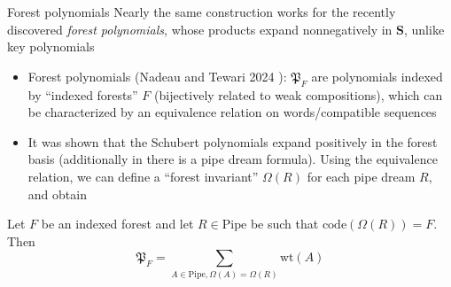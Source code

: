 \documentclass[aspectratio=169]{beamer}
\newcommand{\coma}{\mathbf{S}}
\newcommand{\dcoma}{\mathcal{DS}}
\newcommand{\Forest}[1]{\mathfrak{P}_{#1}}
\newcommand{\RC}{\mathrm{Pipe}}
\begin{document}


\begin{frame}{Forest polynomials}
    Nearly the same construction works for the recently discovered \emph{forest polynomials}, whose products expand nonnegatively in $\coma$, unlike key polynomials
\begin{itemize}
\item Forest polynomials (Nadeau and Tewari 2024 \cite{nadeau2024forest}): $\Forest{F}$ are polynomials indexed by ``indexed forests'' $F$ (bijectively related to weak compositions), which can be characterized by an equivalence relation on words/compatible sequences
\item It was shown that the Schubert polynomials expand positively in the forest basis (additionally in \cite{guo2026forest} there is a pipe dream formula). Using the equivalence relation, we can define a ``forest invariant'' $\Omega(R)$ for each pipe dream $R$, and obtain
\end{itemize}
\begin{theorem}[S, 2026+]
Let $F$ be an indexed forest and let $R\in\RC$ be such that $\mathrm{code}(\Omega(R))=F$. Then
$$\Forest{F}= \sum_{A\in\RC, \Omega(A) = \Omega(R)} \mathrm{wt}(A)$$
\end{theorem}
\end{frame}
\end{document}
